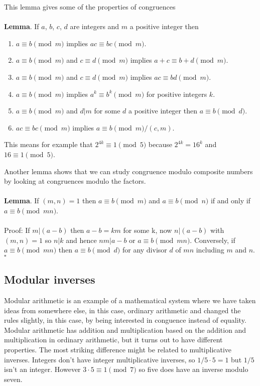 \documentclass[12pt]{article}
\begin{document}
\HandRight This lemma gives some of the properties of congruences\\
\\
\textbf{Lemma}. If $a$, $b$, $c$, $d$ are integers and $m$ a positive integer then
\begin{enumerate}
\item $a\equiv b\pmod m$ implies $ac\equiv bc\pmod m$.
\item $a\equiv b\pmod m$ and $c\equiv d\pmod m$ implies $a+c\equiv b+d\pmod m$.
\item $a\equiv b\pmod m$ and $c\equiv d\pmod m$ implies $ac\equiv bd\pmod m$.
\item $a\equiv b\pmod m$ implies $a^k\equiv b^k\pmod m$ for positive integers $k$.
\item $a\equiv b\pmod m$ and $d|m$ for some $d$ a positive integer then $a\equiv b\pmod d$.
\item $ac\equiv bc\pmod m$ implies $a\equiv b\pmod m/(c,m)$.
\end{enumerate}

This means for example that $2^{4k}\equiv 1 \pmod 5$ because $2^{4k}=16^k$ and $16\equiv 1 \pmod 5$.

Another lemma shows that we can study congruence modulo composite
numbers by looking at congruences modulo the
factors.\\ \\ \textbf{Lemma}. If $(m,n)=1$ then $a\equiv b\pmod m$ and
$a \equiv b \pmod{n}$ if and only if $a\equiv b \pmod
{mn}$.\\ \\ Proof: If $m|(a-b)$ then $a-b=km$ for some k, now $n|(a-b)$
with $(m,n)=1$ so $n|k$ and hence $nm|a-b$ or $a\equiv b\pmod
{mn}$. Conversely, if $a\equiv b\pmod {mn}$ then $a\equiv b \pmod d$ for
any divisor $d$ of $mn$ including $m$ and $n$.$\square$

\subsection*{Modular inverses}

Modular arithmetic is an example of a mathematical system where we
have taken ideas from somewhere else, in this case, ordinary
arithmetic and changed the rules slightly, in this case, by being
interested in conguence instead of equality. Modular arithmetic has
addition and multiplication based on the addition and multiplication
in ordinary arithmetic, but it turns out to have different
properties. The most striking difference might be related to
multiplicative inverses. Integers don't have integer multiplicative
inverses, so $1/5\cdot 5=1$ but $1/5$ isn't an integer. However
$3\cdot 5\equiv 1 \pmod 7$ so five does have an inverse modulo seven.
\end{document}
